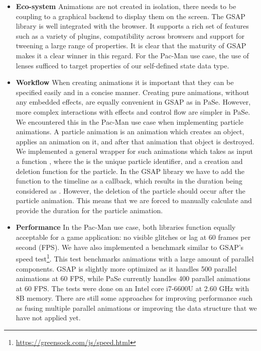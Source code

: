 \begin{itemize}
\item \textbf{Eco-system} Animations are not created in isolation, there needs to be coupling to a graphical backend to display them on the screen. The GSAP library is well integrated with the browser. It supports a rich set of features such as a variety of plugins, compatibility across browsers and support for tweening a large range of properties. It is clear that the maturity of GSAP makes it a clear winner in this regard. For the Pac-Man use case, the use of lenses sufficed to target properties of our self-defined state data type.
\item \textbf{Workflow} When creating animations it is important that they can be specified easily and in a concise manner. Creating pure animations, without any embedded effects, are equally convenient in GSAP as in PaSe. However, more complex interactions with effects and control flow are simpler in PaSe. We encountered this in the Pac-Man use case when implementing particle animations. A particle animation is an animation which creates an object, applies an animation on it, and after that animation that object is destroyed. We implemented a general wrapper for such animations which takes as input a function , where the  is the unique particle identifier, and a creation and deletion function for the particle. In the GSAP library we have to add the function to the timeline as a callback, which results in the duration being considered as . However, the deletion of the particle should occur after the particle animation. This means that we are forced to manually calculate and provide the duration for the particle animation.
\item \textbf{Performance} In the Pac-Man use case, both libraries function equally acceptable for a game application: no visible glitches or lag at 60 frames per second (FPS). We have also implemented a benchmark similar to GSAP's speed test\footnote{\url{https://greensock.com/js/speed.html}}. This test benchmarks animations with a large amount of parallel components. GSAP is slightly more optimized as it handles 500 parallel animations at 60 FPS, while PaSe currently handles 400 parallel animations at 60 FPS. The tests were done on an Intel core i7-6600U at 2.60 GHz with 8B memory. There are still some approaches for improving performance such as fusing multiple parallel animations or improving the  data structure that we have not applied yet.

\end{itemize}
